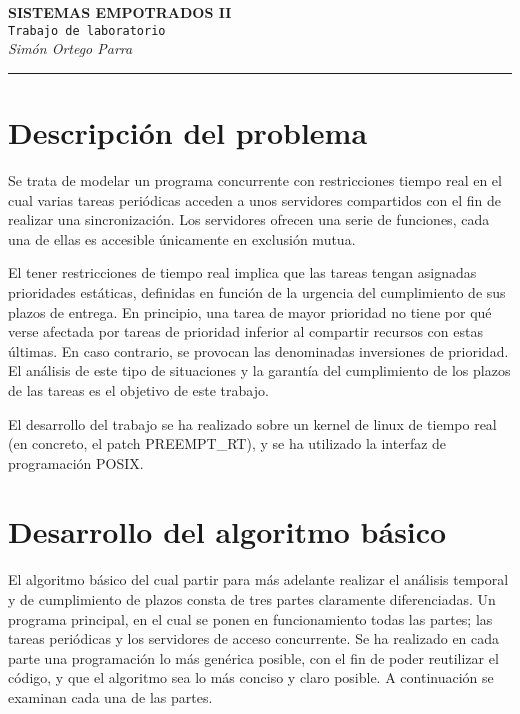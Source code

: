 \documentclass[11pt,spanish]{article}
\newcommand{\singlelinebreak}{\\[\baselineskip]}
\newcommand{\multiplelinebreak}[1]{\\[#1\baselineskip]}
\newcommand\docsubject{SISTEMAS EMPOTRADOS II}
\newcommand\doctitle{Trabajo de laboratorio}
\begin{document}
\noindent
{\huge\bf \docsubject}\multiplelinebreak{1.5}
{\huge\tt \doctitle}\singlelinebreak
{\Large\it Simón Ortego Parra}\\
\rule{\textwidth}{1.5pt}


\section{Descripción del problema}
Se trata de modelar un programa concurrente con restricciones tiempo real en el cual 
varias tareas periódicas acceden a unos servidores compartidos con el fin de realizar 
una sincronización. Los servidores ofrecen una serie de funciones, cada una de ellas 
es accesible únicamente en exclusión mutua.

El tener restricciones de tiempo real implica que las tareas tengan asignadas prioridades 
estáticas, definidas en función de la urgencia del cumplimiento de sus plazos de 
entrega. En principio, una tarea de mayor prioridad no tiene por qué verse afectada por 
tareas de prioridad inferior al compartir recursos con estas últimas. En caso contrario, 
se provocan las denominadas inversiones de prioridad. El análisis de este tipo de situaciones 
y la garantía del cumplimiento de los plazos de las tareas es el objetivo de este trabajo.

El desarrollo del trabajo se ha realizado sobre un kernel de linux de tiempo real (en
concreto, el patch PREEMPT\_RT), y se ha utilizado la interfaz de programación POSIX.

\section{Desarrollo del algoritmo básico}
El algoritmo básico del cual partir para más adelante realizar el análisis temporal y de
cumplimiento de plazos consta de tres partes claramente diferenciadas. Un programa
principal, en el cual se ponen en funcionamiento todas las partes; las tareas periódicas y los 
servidores de acceso concurrente. Se ha realizado en cada parte una programación lo más 
genérica posible, con el fin de poder reutilizar el código, y que el algoritmo sea lo más 
conciso y claro posible. A continuación se examinan cada una de las partes.
\end{document}
